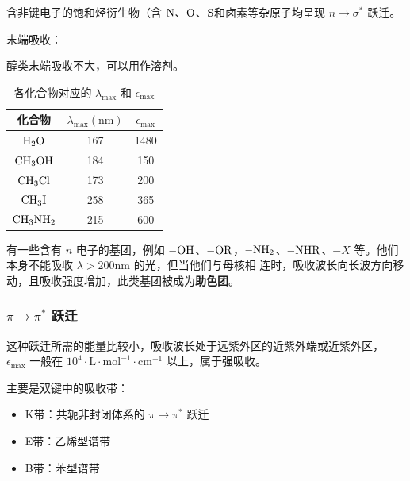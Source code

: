 含非键电子的饱和烃衍生物（含 $\ce{N}$、$\ce{O}$、$\ce{S}$和卤素等杂原子均呈现
$n \rightarrow \sigma^*$ 跃迁。

末端吸收：

醇类末端吸收不大，可以用作溶剂。

\begin{table}[H]
    \centering
    \caption{各化合物对应的 $\lambda_{\max}$ 和 $\epsilon_{\max}$}
    \begin{tabular}{ccc}
        \toprule
        化合物           & $\lambda_{\max} (\mathrm{nm})$ & $ \epsilon_{\max}$ \\
        \midrule
        $\ce{H2O}$    & 167                            & 1480               \\
        $\ce{CH3OH}$  & 184                            & 150                \\
        $\ce{CH3Cl}$  & 173                            & 200                \\
        $\ce{CH3I}$   & 258                            & 365                \\
        $\ce{CH3NH2}$ & 215                            & 600                \\
        \bottomrule
    \end{tabular}
\end{table}

有一些含有 $n$ 电子的基团，例如 $\ce{-OH}$、$\ce{-OR}$，$\ce{-NH2}$、$-\ce{NHR}
$、$-X$ 等。他们本身不能吸收 $\lambda > 200 \mathrm{nm}$ 的光，但当他们与母核相
连时，吸收波长向长波方向移动，且吸收强度增加，此类基团被成为\textbf{助色团}。

\subsubsection{$\pi \rightarrow \pi^*$ 跃迁}

这种跃迁所需的能量比较小，吸收波长处于远紫外区的近紫外端或近紫外区，
$\epsilon_{\max}$ 一般在 $10^4 \cdot \mathrm{L} \cdot \mathrm{mol}^{-1} \cdot
    \mathrm{cm}^{-1}$ 以上，属于强吸收。

主要是双键中的吸收带：

\begin{itemize}
    \item K带：共轭非封闭体系的 $\pi \rightarrow \pi^*$ 跃迁
    \item E带：乙烯型谱带
    \item B带：苯型谱带
\end{itemize}

